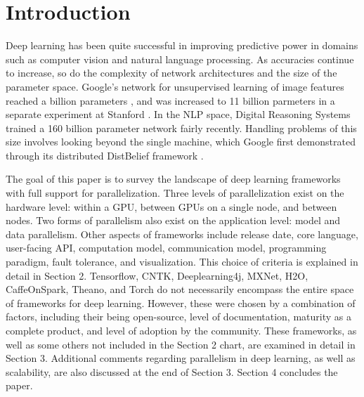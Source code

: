 \section{Introduction}
Deep learning has been quite successful in improving predictive power in domains such as computer vision and natural language processing. As accuracies continue to  increase, so do the complexity of network architectures and the size of the parameter space. Google's network for unsupervised learning of image features reached a billion parameters \cite{donahue2014decaf}, and was increased to 11 billion parmeters in a separate experiment at Stanford \cite{schmidhuber2015deep}. In the NLP space, Digital Reasoning Systems trained a 160 billion parameter network \cite{trask2015modeling} fairly recently. Handling problems of this size involves looking beyond the single machine, which Google first demonstrated through its distributed DistBelief framework \cite{dean2012large}.

The goal of this paper is to survey the landscape of deep learning frameworks with full support for parallelization. Three levels of parallelization exist on the hardware level: within a GPU, between GPUs on a single node, and between nodes. Two forms of parallelism also exist on the application level: model and data parallelism. Other aspects of frameworks include release date, core language, user-facing API, computation model, communication model, programming paradigm, fault tolerance, and visualization. This choice of criteria is explained in detail in Section 2. Tensorflow, CNTK, Deeplearning4j, MXNet, H2O, CaffeOnSpark, Theano, and Torch do not necessarily encompass the entire space of frameworks for deep learning. However, these were chosen by a combination of factors, including their being open-source, level of documentation, maturity as a complete product, and level of adoption by the community. These frameworks, as well as some others not included in the Section 2 chart, are examined in detail in Section 3. Additional comments regarding parallelism in deep learning, as well as scalability, are also discussed at the end of Section 3. Section 4 concludes the paper.
